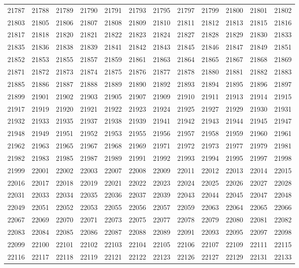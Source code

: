 \begin{center}
\begin{longtable}{llllllllllll}
21787 &21788 &21789 &21790 &21791 &21793 &21795 &21797 &21799 &21800 &21801 &21802 \\
21803 &21805 &21806 &21807 &21808 &21809 &21810 &21811 &21812 &21813 &21815 &21816 \\
21817 &21818 &21820 &21821 &21822 &21823 &21824 &21827 &21828 &21829 &21830 &21833 \\
21835 &21836 &21838 &21839 &21841 &21842 &21843 &21845 &21846 &21847 &21849 &21851 \\
21852 &21853 &21855 &21857 &21859 &21861 &21863 &21864 &21865 &21867 &21868 &21869 \\
21871 &21872 &21873 &21874 &21875 &21876 &21877 &21878 &21880 &21881 &21882 &21883 \\
21885 &21886 &21887 &21888 &21889 &21890 &21892 &21893 &21894 &21895 &21896 &21897 \\
21899 &21901 &21902 &21903 &21905 &21907 &21909 &21910 &21911 &21913 &21914 &21915 \\
21917 &21919 &21920 &21921 &21922 &21923 &21924 &21925 &21927 &21929 &21930 &21931 \\
21932 &21933 &21935 &21937 &21938 &21939 &21941 &21942 &21943 &21944 &21945 &21947 \\
21948 &21949 &21951 &21952 &21953 &21955 &21956 &21957 &21958 &21959 &21960 &21961 \\
21962 &21963 &21965 &21967 &21968 &21969 &21971 &21972 &21973 &21977 &21979 &21981 \\
21982 &21983 &21985 &21987 &21989 &21991 &21992 &21993 &21994 &21995 &21997 &21998 \\
21999 &22001 &22002 &22003 &22007 &22008 &22009 &22011 &22012 &22013 &22014 &22015 \\
22016 &22017 &22018 &22019 &22021 &22022 &22023 &22024 &22025 &22026 &22027 &22028 \\
22031 &22033 &22034 &22035 &22036 &22037 &22039 &22043 &22044 &22045 &22047 &22048 \\
22049 &22051 &22052 &22053 &22055 &22056 &22057 &22059 &22063 &22064 &22065 &22066 \\
22067 &22069 &22070 &22071 &22073 &22075 &22077 &22078 &22079 &22080 &22081 &22082 \\
22083 &22084 &22085 &22086 &22087 &22088 &22089 &22091 &22093 &22095 &22097 &22098 \\
22099 &22100 &22101 &22102 &22103 &22104 &22105 &22106 &22107 &22109 &22111 &22115 \\
22116 &22117 &22118 &22119 &22121 &22122 &22123 &22126 &22127 &22129 &22131 &22133 \\

\end{longtable}
\end{center}
